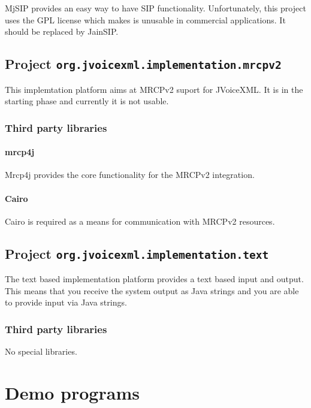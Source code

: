\documentclass[11pt,a4paper]{article}
\begin{document}
MjSIP provides an easy way to have SIP functionality. Unfortunately, this
project uses the GPL license which makes is unusable in commercial
applications. It should be replaced by JainSIP.

\subsection{Project \lstinline{org.jvoicexml.implementation.mrcpv2}}

This implemtation platform aims at MRCPv2 suport for JVoiceXML. It is in the
starting phase and currently it is not usable.

\subsubsection{Third party libraries}
\label{sec:mrcpv2-third-party-libr}

\paragraph{mrcp4j}

Mrcp4j provides the core functionality for the MRCPv2 integration.

\paragraph{Cairo}

Cairo is required as a means for communication with MRCPv2 resources.

\subsection{Project \lstinline{org.jvoicexml.implementation.text}}

The text based implementation platform provides a text based input and output.
This means that you receive the system output as Java strings and you are able
to provide input via Java strings.

\subsubsection{Third party libraries}
\label{sec:text-third-party-libr}

No special libraries.

\section{Demo programs}
\end{document}

